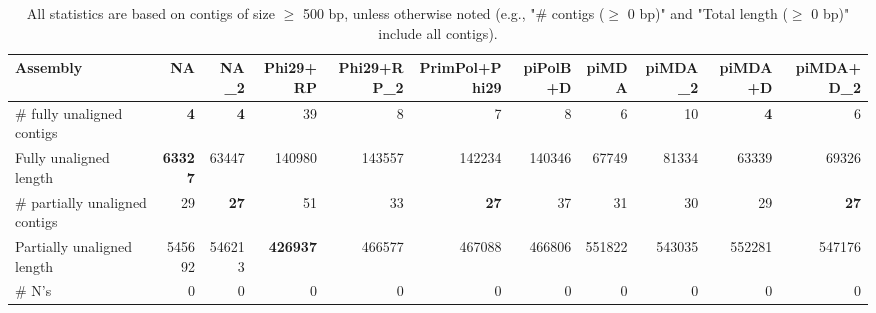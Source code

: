 \documentclass[12pt,a4paper]{article}
\begin{document}
\begin{table}[ht]
\begin{center}
\caption{All statistics are based on contigs of size $\geq$ 500 bp, unless otherwise noted (e.g., "\# contigs ($\geq$ 0 bp)" and "Total length ($\geq$ 0 bp)" include all contigs).}
\begin{tabular}{|l*{10}{|r}|}
\hline
Assembly & NA & NA\_2 & Phi29+RP & Phi29+RP\_2 & PrimPol+Phi29 & piPolB+D & piMDA & piMDA\_2 & piMDA+D & piMDA+D\_2 \\ \hline
\# fully unaligned contigs & {\bf 4} & {\bf 4} & 39 & 8 & 7 & 8 & 6 & 10 & {\bf 4} & 6 \\ \hline
Fully unaligned length & {\bf 63327} & 63447 & 140980 & 143557 & 142234 & 140346 & 67749 & 81334 & 63339 & 69326 \\ \hline
\# partially unaligned contigs & 29 & {\bf 27} & 51 & 33 & {\bf 27} & 37 & 31 & 30 & 29 & {\bf 27} \\ \hline
Partially unaligned length & 545692 & 546213 & {\bf 426937} & 466577 & 467088 & 466806 & 551822 & 543035 & 552281 & 547176 \\ \hline
\# N's & 0 & 0 & 0 & 0 & 0 & 0 & 0 & 0 & 0 & 0 \\ \hline
\end{tabular}
\end{center}
\end{table}
\end{document}
